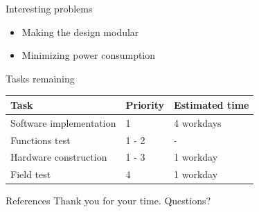 \documentclass{beamer}
\begin{document}
\begin{frame}{Interesting problems}
\begin{itemize}
\item Making the design modular
\item Minimizing power consumption
\end{itemize}
\end{frame}

\begin{frame}{Tasks remaining}
	\begin{tabular}{ | l | l | l |}
    \hline
    Task & Priority & Estimated time\\ \hline
    Software implementation & 1 & 4 workdays \\ \hline
    Functions test & 1 - 2 & - \\ \hline
	Hardware construction & 1 - 3 & 1 workday\\ \hline
	Field test & 4 & 1 workday\\ \hline
    \end{tabular}
\end{frame}

\begin{frame}{References}
Thank you for your time.
Questions?


\end{frame}
\end{document}
